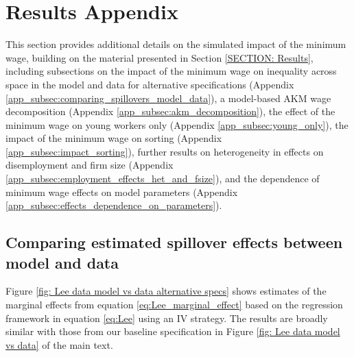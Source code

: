 
\section{Results Appendix\label{APPENDIX: Results}}

This section provides additional details on the simulated impact of the minimum wage, building on the material presented in Section \ref{SECTION: Results}, including subsections on %
%
the impact of the minimum wage on inequality across space in the model and data for alternative specifications (Appendix \ref{app_subsec:comparing_spillovers_model_data}),%
%
a model-based AKM wage decomposition (Appendix \ref{app_subsec:akm_decomposition}), %
%
the effect of the minimum wage on young workers only (Appendix \ref{app_subsec:young_only}), %
%
the impact of the minimum wage on sorting (Appendix \ref{app_subsec:impact_sorting}), %
%
further results on heterogeneity in effects on disemployment and firm size (Appendix \ref{app_subsec:employment_effects_het_and_fsize}), %
%
and the dependence of minimum wage effects on model parameters (Appendix \ref{app_subsec:effects_dependence_on_parameters}).



\clearpage
\subsection{Comparing estimated spillover effects between model and data\label{app_subsec:comparing_spillovers_model_data}}

Figure \ref{fig: Lee data model vs data alternative specs} shows estimates of the marginal effects from equation \eqref{eq:Lee_marginal_effect} based on the regression framework in equation \eqref{eq:Lee} using an IV strategy. The results are broadly similar with those from our baseline specification in Figure \ref{fig: Lee data model vs data} of the main text.

